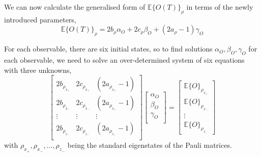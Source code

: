\documentclass[12pt]{iopart}
\begin{document}
We can now calculate the generalised form of $\mathbb{E}\{O(T)\}_\rho$ in terms of the newly introduced parameters,
\begin{equation}
 \mathbb{E}\{O(T)\}_\rho = 2 b_{\rho} \alpha_{O}  + 2 c_{\rho} \beta_{O} + (2a_{\rho} - 1)\gamma_{O} \label{eq:expectation_as_function_of_parameters}
\end{equation}

For each observable, there are six initial states, so to find solutions $\alpha_{O}, \beta_{O}, \gamma_{O}$ for each observable, we need to solve an over-determined system of six equations with three unknowns,
\begin{equation} \label{eq:overdetermined-full-definition}
 \left[\begin{array}{ccc}
            2b_{\rho_{x_+}} & 2c_{\rho_{x_+}} & (2a_{\rho_{x_+}} - 1) \\
            2b_{\rho_{x_-}} & 2c_{\rho_{x_-}} & (2a_{\rho_{x_+}} - 1) \\
            \vdots          & \vdots          & \vdots                \\
            2b_{\rho_{z_-}} & 2c_{\rho_{z_-}} & (2a_{\rho_{z_-}} - 1) \\
        \end{array}\right]
 \left[\begin{array}{c}
            \alpha_{O} \\
            \beta _{O} \\
            \gamma_{O} \\
        \end{array}\right]
 =
 \left[\begin{array}{c}
 \mathbb{E}\{O\}_{\rho_{x_+}} \\
 \mathbb{E}\{O\}_{\rho_{x_-}} \\
            \vdots                       \\
 \mathbb{E}\{O\}_{\rho_{z_-}}
        \end{array}\right]
\end{equation}
with $\rho_{x_+}, \rho_{x_-}, \ldots, \rho_{z_-}$ being the standard eigenstates of the Pauli matrices.

\end{document}

